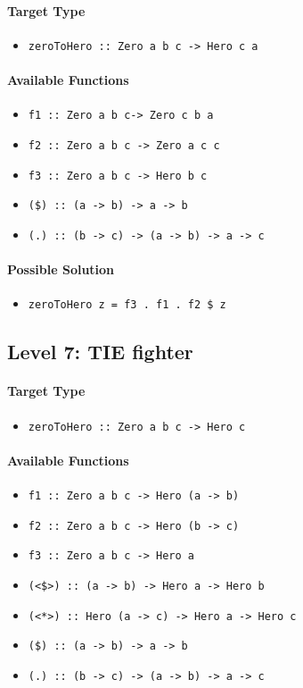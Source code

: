 \documentclass[preprint,12pt]{elsarticle}
\begin{document}
\paragraph{Target Type } 
\begin{itemize}
    \item \texttt{zeroToHero :: Zero a b c -> Hero c a}
\end{itemize}

\paragraph{Available Functions} 
\begin{itemize}
    \item \texttt{f1 :: Zero a b c-> Zero c b a}
    \item \texttt{f2 :: Zero a b c -> Zero a c c}
    \item \texttt{f3 :: Zero a b c -> Hero b c}
    \item \texttt{(\$) :: (a -> b) -> a -> b}
    \item \texttt{(.) :: (b -> c) -> (a -> b) -> a -> c}
\end{itemize}

\paragraph{Possible Solution} 
\begin{itemize}
    \item \texttt{zeroToHero z = f3 . f1 . f2 \$ z}
\end{itemize}

\subsection{Level 7: TIE fighter}
\paragraph{Target Type } 
\begin{itemize}
    \item \texttt{zeroToHero :: Zero a b c -> Hero c}
\end{itemize}

\paragraph{Available Functions} 
\begin{itemize}
    \item \texttt{f1 :: Zero a b c -> Hero (a -> b)}
    \item \texttt{f2 :: Zero a b c -> Hero (b -> c)}
    \item \texttt{f3 :: Zero a b c -> Hero a}
    \item \texttt{(<\$>) :: (a -> b) -> Hero a -> Hero b}
    \item \texttt{(<*>) :: Hero (a -> c) -> Hero a -> Hero c}
    \item \texttt{(\$) :: (a -> b) -> a -> b}
    \item \texttt{(.) :: (b -> c) -> (a -> b) -> a -> c}
\end{itemize}
\end{document}
